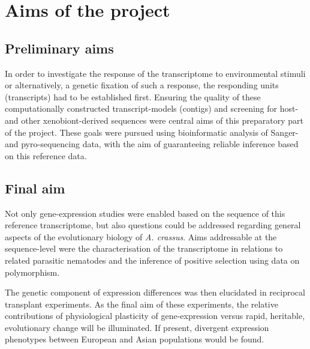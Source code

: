 
\chapter{Aims of the project} %



\section{Preliminary aims}

In order to investigate the response of the transcriptome to
environmental stimuli or alternatively, a genetic fixation of such a
response, the responding units (transcripts) had to be established
first. Ensuring the quality of these computationally constructed
transcript-models (contigs) and screening for host- and other
xenobiont-derived sequences were central aims of this preparatory part
of the project. These goals were pursued using bioinformatic analysis
of Sanger- and pyro-sequencing data, with the aim of guaranteeing
reliable inference based on this reference data.

\section{Final aim}

Not only gene-expression studies were enabled based on the sequence of
this reference transcriptome, but also questions could be addressed
regarding general aspects of the evolutionary biology of
\textit{A. crassus}. Aims addressable at the sequence-level were the
characterisation of the transcriptome in relations to related
parasitic nematodes and the inference of positive selection using
data on polymorphism.

The genetic component of expression differences was then elucidated in
reciprocal transplant experiments. As the final aim of these
experiments, the relative contributions of physiological plasticity of
gene-expression versus rapid, heritable, evolutionary change will be
illuminated. If present, divergent expression phenotypes between
European and Asian populations would be found.




     